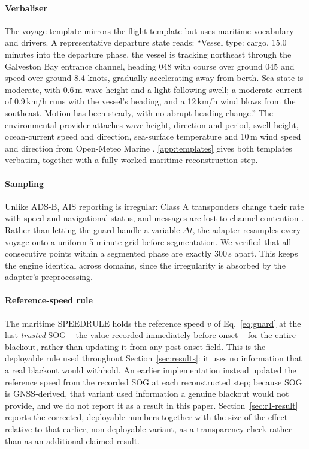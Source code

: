 \paragraph{Verbaliser} The voyage template mirrors the flight template but
uses maritime vocabulary and drivers. A representative departure state
reads: ``Vessel type: cargo. 15.0 minutes into the departure phase, the
vessel is tracking northeast through the Galveston Bay entrance channel,
heading 048\textdegree{} with course over ground 045\textdegree{} and speed
over ground 8.4 knots, gradually accelerating away from berth. Sea state is
moderate, with 0.6\,m wave height and a light following swell; a moderate
current of 0.9\,km/h runs with the vessel's heading, and a 12\,km/h wind
blows from the southeast. Motion has been steady, with no abrupt heading
change.'' The environmental provider attaches wave height, direction and
period, swell height, ocean-current speed and direction, sea-surface
temperature and 10\,m wind speed and direction from Open-Meteo Marine
\citep{openmeteo2025}. \ref{app:templates} gives both templates
verbatim, together with a fully worked maritime reconstruction step.

\paragraph{Sampling} Unlike ADS-B, AIS reporting is irregular: Class A
transponders change their rate with speed and navigational status, and
messages are lost to channel contention \citep{itu2014ais}. Rather than
letting the guard handle a variable $\Delta t$, the adapter resamples every
voyage onto a uniform 5-minute grid before segmentation. We verified that
all consecutive points within a segmented phase are exactly 300\,s apart.
This keeps the engine identical across domains, since the irregularity is
absorbed by the adapter's preprocessing.

\paragraph{Reference-speed rule}
\label{sec:maritime-speedrule}
The maritime $\mathrm{SPEEDRULE}$ holds the reference speed $v$ of
Eq.~\eqref{eq:guard} at the last \emph{trusted} SOG -- the value recorded
immediately before onset -- for the entire blackout, rather than updating it
from any post-onset field. This is the deployable rule used throughout
Section~\ref{sec:results}: it uses no information that a real blackout would
withhold. An earlier implementation instead updated the reference speed from
the recorded SOG at each reconstructed step; because SOG is GNSS-derived,
that variant used information a genuine blackout would not provide, and we
do not report it as a result in this paper. Section~\ref{sec:r1-result}
reports the corrected, deployable numbers together with the size of the
effect relative to that earlier, non-deployable variant, as a transparency
check rather than as an additional claimed result.
